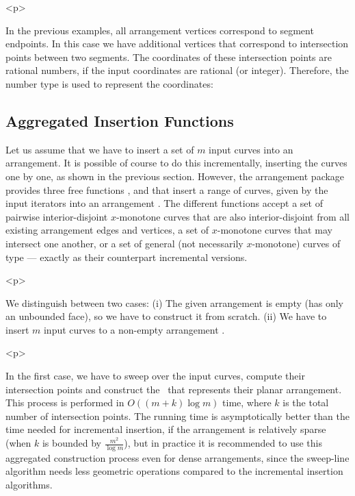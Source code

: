 \begin{ccHtmlOnly}<p>\end{ccHtmlOnly}
In the previous examples, all arrangement vertices correspond to
segment endpoints. In this case we have additional vertices that
correspond to intersection points between two segments. The
coordinates of these intersection points are rational numbers, if
the input coordinates are rational (or integer). Therefore,
the  number type is used to represent the
coordinates:


\subsection{Aggregated Insertion Functions}
\label{arr_ssec:agg_insert}
%
Let us assume that we have to insert a set of $m$ input curves into an
arrangement. It is possible of course to do this incrementally, 
inserting the curves one by one, as shown in the previous section.
However, the arrangement package provides three free functions
,
 and
 that insert a range of curves,
given by the input iterators \ccc{[begin, end)} into an arrangement
. The different functions accept a set of pairwise
interior-disjoint $x$-monotone curves that are also interior-disjoint
from all existing arrangement edges and vertices, a set of $x$-monotone
curves that may intersect one another, or a set of general (not
necessarily $x$-monotone) curves of type  --- exactly as their
counterpart incremental versions.

\begin{ccHtmlOnly}<p>\end{ccHtmlOnly}
We distinguish between two cases: (i) The given arrangement
 is empty (has only an unbounded face), so we have to
construct it from scratch. (ii) We have to insert $m$ input curves
to a non-empty arrangement .

\begin{ccHtmlOnly}<p>\end{ccHtmlOnly}
In the first case, we have to sweep over the input curves, compute
their intersection points and construct the \dcel\ that represents
their planar arrangement. This process is performed in
$O\left((m + k)\log m\right)$ time, where $k$ is the total number
of intersection points. The running time is asymptotically better
than the time needed for incremental insertion, if the arrangement
is relatively sparse (when $k$ is bounded by $\frac{m^2}{\log
m}$), but in practice it is recommended to use this aggregated
construction process even for dense arrangements, since the
sweep-line algorithm needs less geometric operations compared to
the incremental insertion algorithms.

